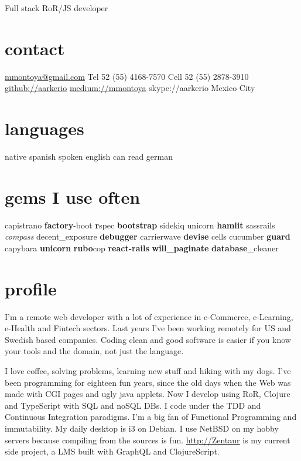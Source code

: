 \documentclass[]{k-cv}
\begin{document}
       {Full stack RoR/JS developer}

\begin{aside}
  \section{contact}
    \href{mailto:mmontoya@gmail.com}{mmontoya@gmail.com}
    Tel  52 (55) 4168-7570
    Cell 52 (55) 2878-3910
    \href{http://github.com/aarkerio}{github://aarkerio}
    \href{https://medium.com/@mmontoya}{medium://mmontoya}
    skype://aarkerio
    Mexico City
  \section{languages}
    native spanish
	  spoken english
	  can read german

  \section{gems I use often}
    capistrano \textbf{factory}-boot \textbf{r}spec
    \textbf{bootstrap} sidekiq unicorn \textbf{hamlit} sassrails \textit{compass}
    decent\_exposure \textbf{debugger} carrierwave \textbf{devise} cells
    cucumber \textbf{guard} capybara \textbf{unicorn}
    \textbf{rubo}cop \textbf{react-rails}
    \textbf{will\_paginate} \textbf{database}\_cleaner

\end{aside}

\section{profile}

I'm a remote web developer with a lot of experience in e-Commerce, e-Learning, e-Health and Fintech sectors.
Last years I've been working remotely for US and Swedish based companies. Coding clean and good software
is easier if you know your tools and the domain, not just the language.

I love coffee, solving problems, learning new stuff and hiking with my dogs. I've been
programming for eighteen fun years, since the old days when the Web was made with CGI
pages and ugly java applets. Now I develop using RoR, Clojure and TypeScript with SQL and
noSQL DBs. I code under the TDD and Continuous Integration paradigms. I'm a big fan of
Functional Programming and immutability. My daily desktop is i3 on Debian. I use NetBSD
on my hobby servers because compiling from the sources is fun. \href{https://github.com/aarkerio/ZentaurLMS/blob/development/src/cljs/zentaur/events.cljs}{http://Zentaur}
is my current side project, a LMS built with GraphQL and ClojureScript.
\end{document}
